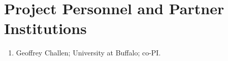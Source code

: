 
\chapter{Project Personnel and Partner Institutions}
\thispagestyle{empty}

\begin{enumerate}

\item Geoffrey Challen; University at Buffalo; co-PI.

\end{enumerate}
